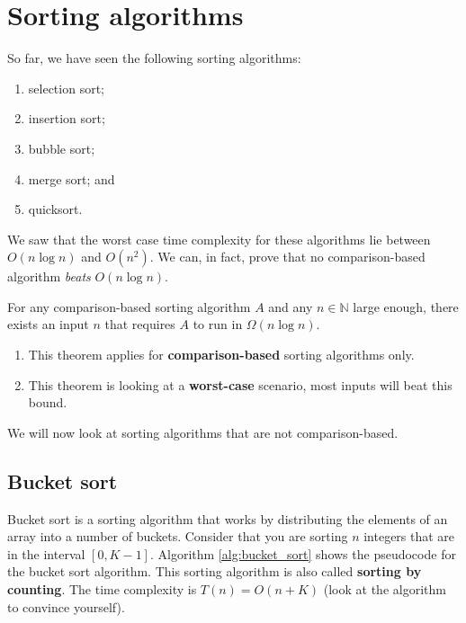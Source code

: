 \chapter{Sorting algorithms}

So far, we have seen the following sorting algorithms:

\begin{multicols}{3}
    \begin{enumerate}
        \item selection sort;
        \item insertion sort;
        \item bubble sort;
        \item merge sort; and
        \item quicksort.
    \end{enumerate}
\end{multicols}

We saw that the worst case time complexity for these algorithms lie between $O(n \log{n})$ and $O(n^2)$. We can, in fact, prove that no comparison-based algorithm \emph{beats} $O(n \log {n})$.

\begin{theorem}\label{the:comparison-based-limit}
    For any comparison-based sorting algorithm $A$ and any $n \in \mathbb{N}$ large enough, there exists an input $n$ that requires $A$ to run in $\Omega(n \log{n})$.
\end{theorem}

\begin{remark}
    \begin{enumerate}
        \item This theorem applies for \textbf{comparison-based} sorting algorithms only.
        \item This theorem is looking at a \textbf{worst-case} scenario, most inputs will beat this bound.
    \end{enumerate}
\end{remark}

We will now look at sorting algorithms that are not comparison-based.

\section{Bucket sort}

Bucket sort is a sorting algorithm that works by distributing the elements of an array into a number of buckets. Consider that you are sorting $n$ integers that are in the interval $[0, K-1]$. Algorithm \ref{alg:bucket_sort} shows the pseudocode for the bucket sort algorithm. This sorting algorithm is also called \textbf{sorting by counting}. The time complexity is $T(n) = O(n + K)$ (look at the algorithm to convince yourself).

